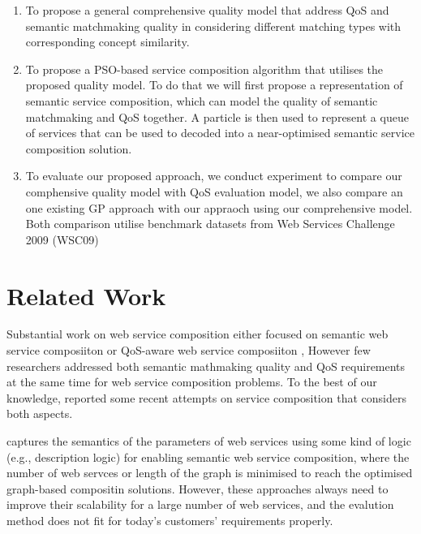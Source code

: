 \documentclass{IEEEtran}
\begin{document}
\begin{enumerate}
 \item To propose a general comprehensive quality model that address QoS and semantic matchmaking quality in considering different matching types with corresponding concept similarity.
  
 \item To propose a PSO-based service composition algorithm that utilises the proposed quality model. To do that we will first propose a representation of semantic service composition, which can model the quality of semantic matchmaking and QoS together. A particle is then used to represent a queue of services that can be used to decoded into a near-optimised semantic service composition solution.
  
 \item To evaluate our proposed approach, we conduct experiment to compare our comphensive quality model with QoS evaluation model, we also compare an one existing GP approach with our appraoch using our comprehensive model. Both comparison utilise benchmark datasets from Web Services Challenge 2009 (WSC09) \cite{kona2009wsc} 
  
\end{enumerate}

\section{Related Work} \label{relatedWork}
Substantial work on web service composition either focused on semantic web service composiiton \cite{boustil2014semantic,mier2015integrated, bansal2016generalized} or QoS-aware web service composiiton \cite{da2016particle,da2015graphevol,yu2013adaptive, gupta2015optimization,qi2010combining}, However few researchers addressed both semantic mathmaking quality and QoS requirements at the same time for web service composition problems. To the best of our knowledge, \cite{lecue2009optimizing,fanjiang2014semantic,pop2009immune} reported some recent attempts on service composition that considers both aspects.

\cite{boustil2014semantic,mier2015integrated, bansal2016generalized} captures the semantics of the parameters of web services using some kind of logic (e.g., description logic) for enabling semantic web service composition, where the number of web servces or length of the graph is minimised to reach the optimised graph-based compositin solutions. However, these approaches always need to improve their scalability for a large number of web services, and the evalution method does not fit for today's customers' requirements properly.
\end{document}
